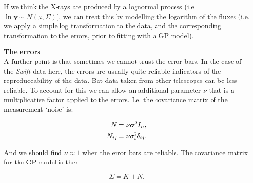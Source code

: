 \documentclass[a4paper, 11pt, amsmath, graphicx]{article}\usepackage[]{graphicx}\usepackage[]{color}
\def\bs{{\mbox{\boldmath $\sigma$}}}
\begin{document}
If we think the X-rays are produced by a lognormal process (i.e. $\ln \mathbf{y} \sim N(\mu, \Sigma)$), we can treat this by modelling the logarithm of the fluxes (i.e. we apply a simple log transformation to the data, and the corresponding transformation to the errors, prior to fitting with a GP model).

\vspace{0.4cm}
\textbf{The errors}
\\

A further point is that sometimes we cannot trust the error bars. In the case of the \emph{Swift} data here, the errors are usually quite reliable indicators of the reproduceability of the data. But data taken from other telescopes can be less reliable. To account for this we can allow an additional parameter $\nu$ that is a multiplicative factor applied to the errors. I.e. the covariance matrix of the measurement `noise' is:

\begin{align}
 N & = \nu \bs^2 I_n, \nonumber \\
 N_{ij} & = \nu \sigma_i^2 \delta_{ij}.
\end{align}

And we should find $\nu \approx 1$ when the error bars are reliable. The covariance matrix for the GP model is then 

\begin{equation}
  \Sigma = K + N.
\end{equation}
\end{document}

